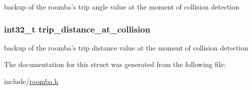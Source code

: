 backup of the roomba's trip angle value at the moment of collision detection \hypertarget{structcollision__data_ab029fc46a5f17b2301b1afa7baba9b66}{
\subsubsection[{trip\-\_\-distance\-\_\-at\-\_\-collision}]{\setlength{\rightskip}{0pt plus 5cm}int32\-\_\-t {\bf trip\-\_\-distance\-\_\-at\-\_\-collision}}}\label{structcollision__data_ab029fc46a5f17b2301b1afa7baba9b66}
backup of the roomba's trip distance value at the moment of collision detection 

\-The documentation for this struct was generated from the following file\-:\begin{DoxyCompactItemize}
\item 
include/\hyperlink{roomba_8h}{roomba.\-h}\end{DoxyCompactItemize}

